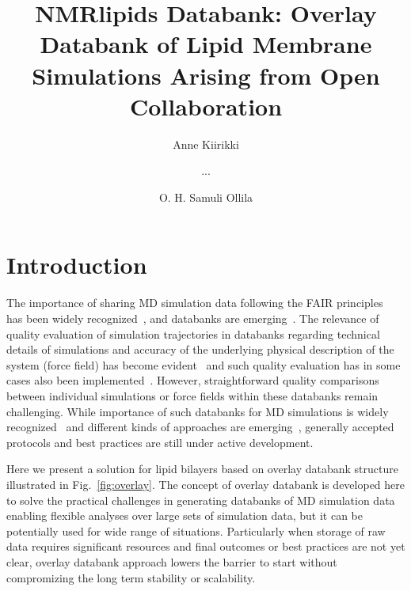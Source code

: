 \documentclass[fleqn,10pt]{wlscirep}
\title{NMRlipids Databank: Overlay Databank of Lipid Membrane Simulations Arising from Open Collaboration}
\author[1]{Anne Kiirikki}
\author[2]{...}
\author[1,*]{O. H. Samuli Ollila}
\affil[1]{University of Helsinki, Institute of Biotechonology, Helsinki, Finland}
\affil[2]{Affiliation, department, city, postcode, country}
\affil[*]{samuli.ollila@helsinki.fi}
\begin{document}
\flushbottom
\maketitle
%
%
\thispagestyle{empty}


\section{Introduction}



The importance of sharing MD simulation data following the FAIR principles~\cite{wilkinson16} has been widely recognized~\cite{feig99,tai04,silva06,abraham19,hildebrand19,hospital20,abriata20,espigares20}, and databanks are emerging~\cite{meyer10,kamp10,hospital16,mixcoha16,newport19,bekker20,espigares20,leston22}.
The relevance of quality evaluation of simulation trajectories in databanks regarding technical details of simulations and accuracy of the underlying physical description of the system (force field) has become evident~\cite{tai04,meyer10,hospital20} and such quality evaluation has in some cases also been implemented~\cite{meyer10,hospital16}. However, straightforward quality comparisons between individual simulations or force fields within these databanks remain challenging. 
While importance of such databanks for MD simulations is widely recognized~\cite{feig99,tai04,silva06,abraham19,hildebrand19,hospital20,abriata20,espigares20} and different kinds of approaches are emerging~\cite{meyer10,kamp10,hospital16,mixcoha16,newport19,bekker20,espigares20,leston22}, generally accepted protocols and best practices are still under active development.


Here we present a solution for lipid bilayers based on overlay databank structure illustrated in Fig.~\ref{fig:overlay}.  The concept of overlay databank is developed here to solve the practical challenges in generating databanks of MD simulation data enabling flexible analyses over large sets of simulation data, but it can be  potentially used for wide range of situations. Particularly when storage of raw data requires significant resources and final outcomes or best practices are not yet clear, overlay databank approach lowers the barrier to start without compromizing the long term stability or scalability.
\end{document}
